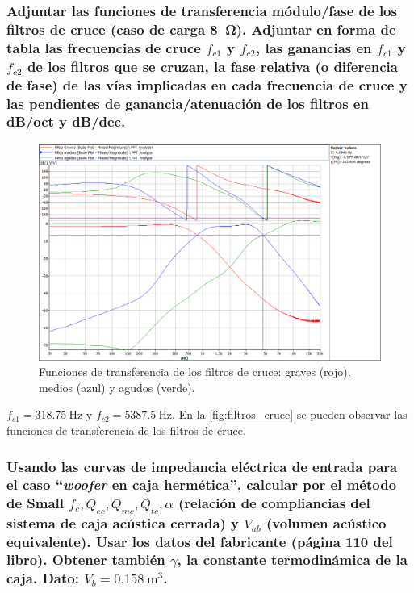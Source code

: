 \documentclass[10pt]{article}
\begin{document}
\subsubsection{Adjuntar las funciones de transferencia módulo/fase de los filtros de cruce (caso de carga \qty{8}{\ohm}). Adjuntar en forma de tabla las frecuencias de cruce $f_{c1}$ y $f_{c2}$, las ganancias en $f_{c1}$ y $f_{c2}$ de los filtros que se cruzan, la fase relativa (o diferencia de fase) de las vías implicadas en cada frecuencia de cruce y las pendientes de ganancia/atenuación de los filtros en dB/oct y dB/dec.}


\begin{figure}[hbtp]
  \centering
  \includegraphics[width=\linewidth]{filtros_cruce.png}
  \caption{Funciones de transferencia de los filtros de cruce: graves (rojo), medios (azul) y agudos (verde).}
  \label{fig:filtros_cruce}
\end{figure}

$f_{c1} = \qty{318.75}{\hertz } $ y $f_{c2} = \qty{5387.5}{\hertz }$. En la \autoref{fig:filtros_cruce} se pueden observar las funciones de transferencia de los filtros de cruce.


\subsubsection{Usando las curvas de impedancia eléctrica de entrada para el caso ``\textit{woofer} en caja hermética'', calcular por el método de Small $f_c, Q_{ec}, Q_{mc}, Q_{tc}, \alpha$ (relación de compliancias del sistema de caja acústica cerrada) y $V_{ab}$ (volumen acústico equivalente). Usar los datos del fabricante (página 110 del libro). Obtener también $\gamma$, la constante termodinámica de la caja. Dato: $V_b = \qty{0.158}{\metre\cubed}$.}
\end{document}
